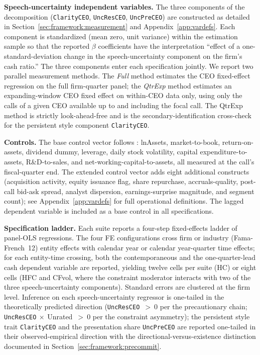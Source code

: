 \textbf{Speech-uncertainty independent variables.} The three components of the  decomposition (\texttt{ClarityCEO}, \texttt{UncResCEO}, \texttt{UncPreCEO}) are constructed as detailed in Section~\ref{sec:framework:measurement} and Appendix~\ref{app:vardefs}. Each component is standardized (mean zero, unit variance) within the estimation sample so that the reported $\beta$ coefficients have the interpretation ``effect of a one-standard-deviation change in the speech-uncertainty component on the firm's cash ratio.'' The three components enter each specification jointly. We report two parallel measurement methods. The \emph{Full} method estimates the CEO fixed-effect regression on the full firm-quarter panel; the \emph{QtrExp} method estimates an expanding-window CEO fixed effect on within-CEO data only, using only the calls of a given CEO available up to and including the focal call. The QtrExp method is strictly look-ahead-free and is the secondary-identification cross-check for the persistent style component \texttt{ClarityCEO}.

\textbf{Controls.} The base control vector follows : lnAssets, market-to-book, return-on-assets, dividend dummy, leverage, daily stock volatility, capital expenditure-to-assets, R\&D-to-sales, and net-working-capital-to-assets, all measured at the call's fiscal-quarter end. The extended control vector adds eight additional constructs (acquisition activity, equity issuance flag, share repurchase, accruals-quality, post-call bid-ask spread, analyst dispersion, earnings-surprise magnitude, and segment count); see Appendix~\ref{app:vardefs} for full operational definitions. The lagged dependent variable is included as a base control in all specifications.

\textbf{Specification ladder.} Each suite reports a four-step fixed-effects ladder of panel-OLS regressions. The four FE configurations cross firm or industry (Fama-French~12) entity effects with calendar year or calendar year-quarter time effects; for each entity-time crossing, both the contemporaneous and the one-quarter-lead cash dependent variable are reported, yielding twelve cells per suite (HC) or eight cells (HFC and CFvol, where the constraint moderator interacts with two of the three speech-uncertainty components). Standard errors are clustered at the firm level. Inference on each speech-uncertainty regressor is one-tailed in the theoretically predicted direction (\texttt{UncResCEO}~$>~0$ per the precautionary chain; \texttt{UncResCEO}$~\times~$Unrated~$>~0$ per the constraint asymmetry); the persistent style trait \texttt{ClarityCEO} and the presentation share \texttt{UncPreCEO} are reported one-tailed in their observed-empirical direction with the directional-versus-existence distinction documented in Section~\ref{sec:framework:precommit}.

